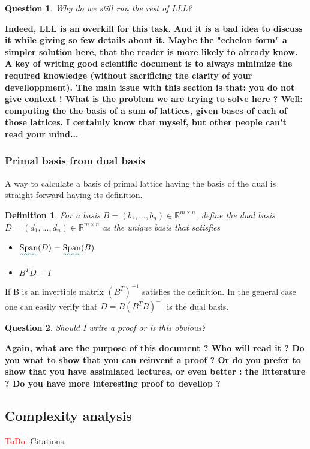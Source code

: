 \documentclass[12pt]{article}
\DeclareMathOperator{\Span}{Span}
\newtheorem{question}{Question}
\newtheorem{definition}{Definition}
\def\added{\bgroup \markoverwith{\textcolor{green!50!blue}{\lower4.5pt\hbox{\sixly \char58}}}\ULon}
\begin{document}
\begin{question}
    Why do we still run the rest of LLL?
\end{question}
{\bf Indeed, LLL is an overkill for this task. And it is a bad idea to discuss it while giving so few details about it. Maybe the "echelon form" a simpler solution here, that the reader is more likely to already know. A key of writing good scientific document is to always minimize the required knowledge (without sacrificing the clarity of your develloppment). The main issue with this section is that: you do not give context ! What is the problem we are trying to solve here ? Well: computing the the basis of a sum of lattices, given bases of each of those lattices. I certainly know that myself, but other people can't read your mind...}


\subsubsection{Primal basis from dual basis}
A way to calculate a basis of primal lattice having the basis of the dual is straight forward having its definition.

\begin{definition}
    For a basis $B = (b_{1}, ..., b_{n}) \in \mathbb{R}^{m \times n}$, define the dual basis $D = (d_{1}, ..., d_{n}) \in \mathbb{R}^{m \times n}$ as the unique basis that satisfies
    \begin{itemize}
        \item $\added{\Span}(D) = \added{\Span}(B)$
        \item $B^{T}D = I$
    \end{itemize}
\end{definition}
If B is an invertible matrix $(B^{T})^{-1}$ satisfies the definition. In the general case one can easily verify that $D = B(B^{T}B)^{-1}$ is the dual basis.

\begin{question}
    Should I write a proof or is this obvious?
\end{question}
{\bf Again, what are the purpose of this document ? Who will read it ? Do you wnat to show that you can reinvent a proof ? Or do you prefer to show that you have assimlated lectures, or even better : the litterature ? Do you have more interesting proof to devellop ?}

\subsection{Complexity analysis}
\textcolor{red}{ToDo}: Citations.
\end{document}
